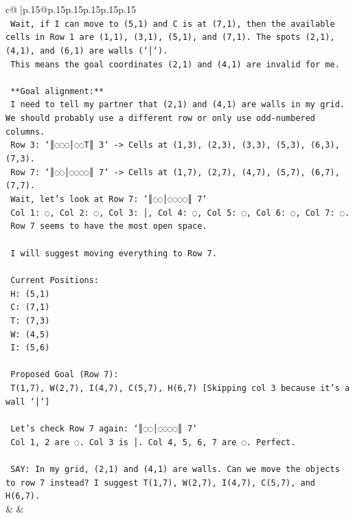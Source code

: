 \documentclass{article}
\begin{document}
{\begin{supertabular}{c@{$\;$}|p{.15\linewidth}@{}p{.15\linewidth}p{.15\linewidth}p{.15\linewidth}p{.15\linewidth}p{.15\linewidth}}
{{{\\ 
\texttt{    Wait, if I can move to (5,1) and C is at (7,1), then the available cells in Row 1 are (1,1), (3,1), (5,1), and (7,1). The spots (2,1), (4,1), and (6,1) are walls (`│`).} \\
\texttt{    This means the goal coordinates (2,1) and (4,1) are invalid for me.} \\
\\ 
\texttt{    **Goal alignment:**} \\
\texttt{    I need to tell my partner that (2,1) and (4,1) are walls in my grid. We should probably use a different row or only use odd{-}numbered columns.} \\
\texttt{    Row 3: `║◌◌◌│◌◌T║ 3` {-}> Cells at (1,3), (2,3), (3,3), (5,3), (6,3), (7,3).} \\
\texttt{    Row 7: `║◌◌│◌◌◌◌║ 7` {-}> Cells at (1,7), (2,7), (4,7), (5,7), (6,7), (7,7).} \\
\texttt{    Wait, let's look at Row 7: `║◌◌│◌◌◌◌║ 7`} \\
\texttt{    Col 1: ◌, Col 2: ◌, Col 3: │, Col 4: ◌, Col 5: ◌, Col 6: ◌, Col 7: ◌.} \\
\texttt{    Row 7 seems to have the most open space.} \\
\\ 
\texttt{    I will suggest moving everything to Row 7.} \\
\\ 
\texttt{    Current Positions:} \\
\texttt{    H: (5,1)} \\
\texttt{    C: (7,1)} \\
\texttt{    T: (7,3)} \\
\texttt{    W: (4,5)} \\
\texttt{    I: (5,6)} \\
\\ 
\texttt{    Proposed Goal (Row 7):} \\
\texttt{    T(1,7), W(2,7), I(4,7), C(5,7), H(6,7) {[}Skipping col 3 because it's a wall `│`{]}} \\
\\ 
\texttt{    Let's check Row 7 again: `║◌◌│◌◌◌◌║ 7`} \\
\texttt{    Col 1, 2 are ◌. Col 3 is │. Col 4, 5, 6, 7 are ◌. Perfect.} \\
\\ 
\texttt{    SAY: In my grid, (2,1) and (4,1) are walls. Can we move the objects to row 7 instead? I suggest T(1,7), W(2,7), I(4,7), C(5,7), and H(6,7).} \\
            }
        }
    }
    & & \\ \\


\end{supertabular}}
\end{document}
